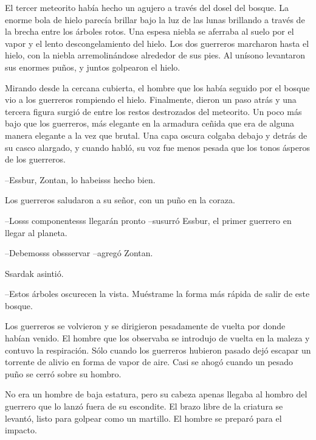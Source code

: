 El tercer meteorito había hecho un agujero a través del dosel del bosque. La enorme bola de hielo parecía brillar bajo la luz de las lunas brillando a través de la brecha entre los árboles rotos. Una espesa niebla se aferraba al suelo por el vapor y el lento descongelamiento del hielo. Los dos guerreros marcharon hasta el hielo, con la niebla arremolinándose alrededor de sus pies. Al unísono levantaron sus enormes puños, y juntos golpearon el hielo.



Mirando desde la cercana cubierta, el hombre que los había seguido por el bosque vio a los guerreros rompiendo el hielo. Finalmente, dieron un paso atrás y una tercera figura surgió de entre los restos destrozados del meteorito. Un poco más bajo que los guerreros, más elegante en la armadura ceñida que era de alguna manera elegante a la vez que brutal. Una capa oscura colgaba debajo y detrás de su casco alargado, y cuando habló, su voz fue menos pesada que los tonos ásperos de los guerreros.



--Essbur, Zontan, lo habeisss hecho bien. 



Los guerreros saludaron a su señor, con un puño en la coraza.



--Losss componentesss llegarán pronto --susurró Essbur, el primer guerrero en llegar al planeta.



--Debemosss obssservar --agregó Zontan.



Ssardak asintió.

--Estos árboles oscurecen la vista. Muéstrame la forma más rápida de salir de este bosque.



Los guerreros se volvieron y se dirigieron pesadamente de vuelta por donde habían venido. El hombre que los observaba se introdujo de vuelta en la maleza y contuvo la respiración. Sólo cuando los guerreros hubieron pasado dejó escapar un torrente de alivio en forma de vapor de aire. Casi se ahogó cuando un pesado puño se cerró sobre su hombro.



No era un hombre de baja estatura, pero su cabeza apenas llegaba al hombro del guerrero que lo lanzó fuera de su escondite. El brazo libre de la criatura se levantó, listo para golpear como un martillo. El hombre se preparó para el impacto.



